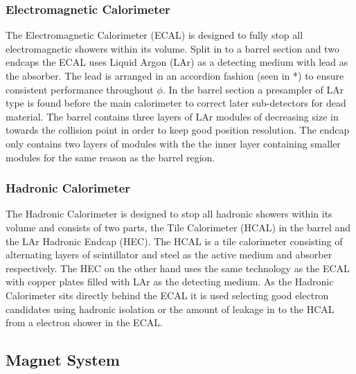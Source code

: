 		\subsubsection*{Electromagnetic Calorimeter}

		The Electromagnetic Calorimeter (ECAL) is designed to fully stop all electromagnetic showers within its volume. Split in to a barrel section and two endcaps the ECAL uses Liquid Argon (LAr) as a detecting medium with lead as the absorber. The lead is arranged in an accordion fashion (seen in *) to ensure consistent performance throughout $\phi$. In the barrel section a presampler of LAr type is found before the main calorimeter to correct later sub-detectors for dead material. The barrel contains three layers of LAr modules of decreasing size in towards the collision point in order to keep good position resolution. The endcap only contains two layers of modules with the the inner layer containing smaller modules for the same reason as the barrel region.\\


		\subsubsection*{Hadronic Calorimeter}

		The Hadronic Calorimeter is designed to stop all hadronic showers within its volume and consists of two parts, the Tile Calorimeter (HCAL) in the barrel and the LAr Hadronic Endcap (HEC). The HCAL is a tile calorimeter consisting of alternating layers of scintillator and steel as the active medium and absorber respectively. The HEC on the other hand uses the same technology as the ECAL with copper plates filled with LAr as the detecting medium. As the Hadronic Calorimeter sits directly behind the ECAL it is used selecting good electron candidates using hadronic isolation or the amount of leakage in to the HCAL from a electron shower in the ECAL.\\
		


	\subsection{Magnet System}

